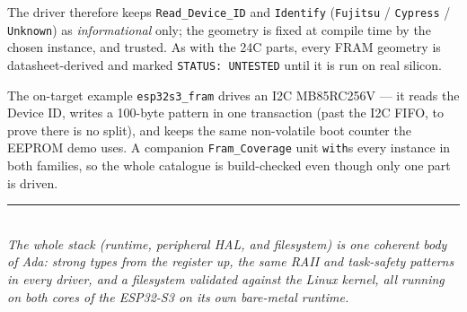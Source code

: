 The driver therefore keeps \texttt{Read\_Device\_ID} and \texttt{Identify}
(\texttt{Fujitsu} / \texttt{Cypress} / \texttt{Unknown}) as \emph{informational}
only; the geometry is fixed at compile time by the chosen instance, and trusted. As
with the 24C parts, every FRAM geometry is datasheet-derived and marked
\texttt{STATUS: UNTESTED} until it is run on real silicon.

\noindent The on-target example \texttt{esp32s3\_fram} drives an I2C
MB85RC256V --- it reads the Device ID, writes a 100-byte pattern in one
transaction (past the I2C FIFO, to prove there is no split), and keeps the same
non-volatile boot counter the EEPROM demo uses. A companion \texttt{Fram\_Coverage}
unit \texttt{with}s every instance in both families, so the whole catalogue is
build-checked even though only one part is driven.

\vfill
\noindent\rule{\linewidth}{0.4pt}\\[4pt]
\textit{The whole stack (runtime, peripheral HAL, and filesystem) is one coherent
body of Ada: strong types from the register up, the same RAII and task-safety
patterns in every driver, and a filesystem validated against the Linux kernel, all
running on both cores of the ESP32-S3 on its own bare-metal runtime.}
